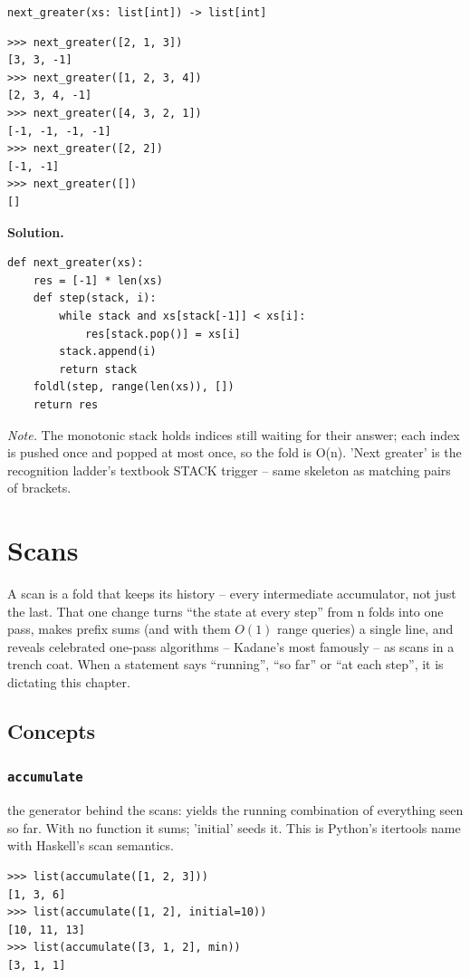 \documentclass[10pt,letterpaper]{book}
\begin{document}
\noindent\texttt{next\_greater(xs: list[int]) -> list[int]}
\begin{lstlisting}[style=ex]
>>> next_greater([2, 1, 3])
[3, 3, -1]
>>> next_greater([1, 2, 3, 4])
[2, 3, 4, -1]
>>> next_greater([4, 3, 2, 1])
[-1, -1, -1, -1]
>>> next_greater([2, 2])
[-1, -1]
>>> next_greater([])
[]
\end{lstlisting}
\noindent\textbf{Solution.}
\begin{lstlisting}[style=code]
def next_greater(xs):
    res = [-1] * len(xs)
    def step(stack, i):
        while stack and xs[stack[-1]] < xs[i]:
            res[stack.pop()] = xs[i]
        stack.append(i)
        return stack
    foldl(step, range(len(xs)), [])
    return res
\end{lstlisting}
\noindent\textit{Note.} The monotonic stack holds indices still waiting for their answer; each index is pushed once and popped at most once, so the fold is O(n). 'Next greater' is the recognition ladder's textbook STACK trigger -- same skeleton as matching pairs of brackets.

\clearpage
\chapter{Scans}

A scan is a fold that keeps its history -- every intermediate accumulator,
not just the last. That one change turns ``the state at every step'' from n
folds into one pass, makes prefix sums (and with them $O(1)$ range queries)
a single line, and reveals celebrated one-pass algorithms -- Kadane's most
famously -- as scans in a trench coat. When a statement says ``running'',
``so far'' or ``at each step'', it is dictating this chapter.
\section{Concepts}
\subsection{\texttt{accumulate}}\label{def:accumulate}
the generator behind the scans: yields the running combination of everything seen so far. With no function it sums; 'initial' seeds it. This is Python's itertools name with Haskell's scan semantics.
\begin{lstlisting}[style=ex]
>>> list(accumulate([1, 2, 3]))
[1, 3, 6]
>>> list(accumulate([1, 2], initial=10))
[10, 11, 13]
>>> list(accumulate([3, 1, 2], min))
[3, 1, 1]
\end{lstlisting}
\end{document}
